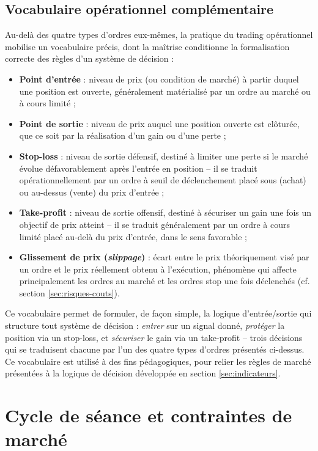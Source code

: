 \documentclass{rapportENSIAS} %
\begin{document}
\subsection{Vocabulaire opérationnel complémentaire}

\noindent
Au-delà des quatre types d'ordres eux-mêmes, la pratique du trading opérationnel mobilise un vocabulaire précis, dont la maîtrise conditionne la formalisation correcte des règles d'un système de décision :

\begin{itemize}
    \item \textbf{Point d'entrée} : niveau de prix (ou condition de marché) à partir duquel une position est ouverte, généralement matérialisé par un ordre au marché ou à cours limité ;
    \item \textbf{Point de sortie} : niveau de prix auquel une position ouverte est clôturée, que ce soit par la réalisation d'un gain ou d'une perte ;
    \item \textbf{Stop-loss} : niveau de sortie défensif, destiné à limiter une perte si le marché évolue défavorablement après l'entrée en position -- il se traduit opérationnellement par un ordre à seuil de déclenchement placé sous (achat) ou au-dessus (vente) du prix d'entrée ;
    \item \textbf{Take-profit} : niveau de sortie offensif, destiné à sécuriser un gain une fois un objectif de prix atteint -- il se traduit généralement par un ordre à cours limité placé au-delà du prix d'entrée, dans le sens favorable ;
    \item \textbf{Glissement de prix (\textit{slippage})} : écart entre le prix théoriquement visé par un ordre et le prix réellement obtenu à l'exécution, phénomène qui affecte principalement les ordres au marché et les ordres stop une fois déclenchés (cf. section \ref{sec:risques-couts}).
\end{itemize}

\noindent
Ce vocabulaire permet de formuler, de façon simple, la logique d'entrée/sortie qui structure tout système de décision : \textit{entrer} sur un signal donné, \textit{protéger} la position via un stop-loss, et \textit{sécuriser} le gain via un take-profit -- trois décisions qui se traduisent chacune par l'un des quatre types d'ordres présentés ci-dessus. Ce vocabulaire est utilisé à des fins pédagogiques, pour relier les règles de marché présentées à la logique de décision développée en section \ref{sec:indicateurs}.

\section{Cycle de séance et contraintes de marché}
\end{document}
